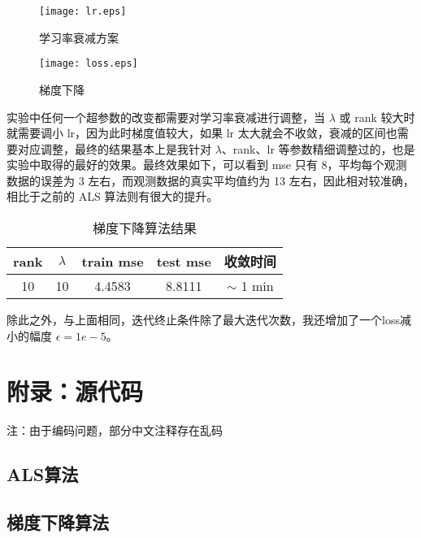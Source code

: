 \documentclass[UTF8,12pt]{ctexart}
\begin{document}
\begin{figure}[!htbp]
	\centering
	\texttt{[image: lr.eps]}
	\caption{学习率衰减方案}
	\label{img:lr}
\end{figure}

\begin{figure}[!htbp]
	\centering
	\texttt{[image: loss.eps]}
	\caption{梯度下降}
	\label{img:loss}
\end{figure}

实验中任何一个超参数的改变都需要对学习率衰减进行调整，当 $\lambda$ 或 rank 较大时就需要调小 lr，因为此时梯度值较大，如果 lr 太大就会不收敛，衰减的区间也需要对应调整，最终的结果基本上是我针对 $\lambda$、rank、lr 等参数精细调整过的，也是实验中取得的最好的效果。最终效果如下，可以看到 mse 只有 8，平均每个观测数据的误差为 3 左右，而观测数据的真实平均值约为 13 左右，因此相对较准确，相比于之前的 ALS 算法则有很大的提升。

\begin{table}[!htbp]
\centering
\begin{tabular}{|c|c|c|c|c|}
\hline
rank & $\lambda$ & train mse & test mse & 收敛时间 \\ \hline
10 & 10 & 4.4583 & 8.8111 & $\sim$ 1 min \\ \hline
\end{tabular}
\caption{梯度下降算法结果}
\end{table}

除此之外，与上面相同，迭代终止条件除了最大迭代次数，我还增加了一个loss减小的幅度 $\epsilon = 1e-5$。


\section{附录：源代码}
注：由于编码问题，部分中文注释存在乱码
\subsection{ALS算法}


\subsection{梯度下降算法}

\end{document}
